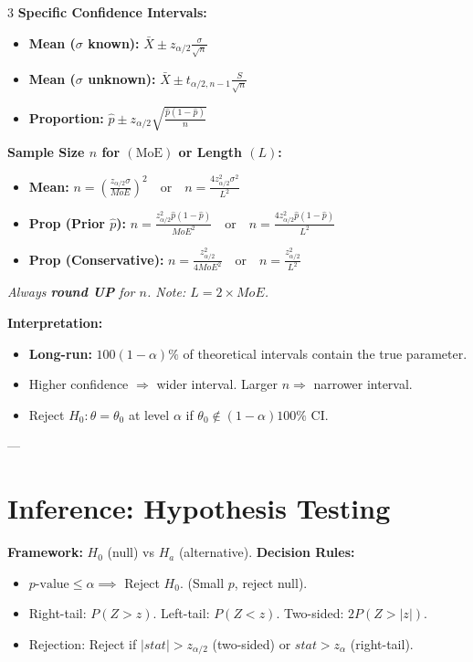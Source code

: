 \documentclass[10pt]{article}
\begin{document}
\begin{multicols}{3}
\textbf{Specific Confidence Intervals:}
\begin{itemize}
    \item \textbf{Mean ($\sigma$ known):} $\bar{X} \pm z_{\alpha/2} \frac{\sigma}{\sqrt{n}}$
    \item \textbf{Mean ($\sigma$ unknown):} $\bar{X} \pm t_{\alpha/2, n-1} \frac{S}{\sqrt{n}}$
    \item \textbf{Proportion:} $\hat{p} \pm z_{\alpha/2} \sqrt{\frac{\hat{p}(1-\hat{p})}{n}}$
\end{itemize}

\textbf{Sample Size $n$ for $(\text{MoE})$ or Length $(L)$:}
\begin{itemize}
    \item \textbf{Mean:} $n = \left( \frac{z_{\alpha/2} \sigma}{MoE} \right)^2 \quad \text{or} \quad n = \frac{4z_{\alpha/2}^2 \sigma^2}{L^2}$
    \item \textbf{Prop (Prior $\hat{p}$):} $n = \frac{z_{\alpha/2}^2 \hat{p}(1-\hat{p})}{MoE^2} \quad \text{or} \quad n = \frac{4z_{\alpha/2}^2 \hat{p}(1-\hat{p})}{L^2}$
    \item \textbf{Prop (Conservative):} $n = \frac{z_{\alpha/2}^2}{4 MoE^2} \quad \text{or} \quad n = \frac{z_{\alpha/2}^2}{L^2}$
\end{itemize}
\textit{Always \textbf{round UP} for $n$. Note: $L = 2 \times MoE$.}

\textbf{Interpretation:}
\begin{itemize}
    \item \textbf{Long-run:} $100(1-\alpha)\%$ of theoretical intervals contain the true parameter.
    \item Higher confidence $\Rightarrow$ wider interval. Larger $n \Rightarrow$ narrower interval.
    \item Reject $H_0: \theta = \theta_0$ at level $\alpha$ if $\theta_0 \notin (1-\alpha)100\%$ CI.
\end{itemize}

---

\section*{Inference: Hypothesis Testing}
\textbf{Framework:} $H_0$ (null) vs $H_a$ (alternative).
\textbf{Decision Rules:}
\begin{itemize}
    \item $p\text{-value} \le \alpha \implies$ Reject $H_0$. (Small $p$, reject null).
    \item Right-tail: $P(Z > z)$. Left-tail: $P(Z < z)$. Two-sided: $2P(Z > |z|)$.
    \item Rejection: Reject if $|stat| > z_{\alpha/2}$ (two-sided) or $stat > z_\alpha$ (right-tail).
\end{itemize}


\end{multicols}
\end{document}
